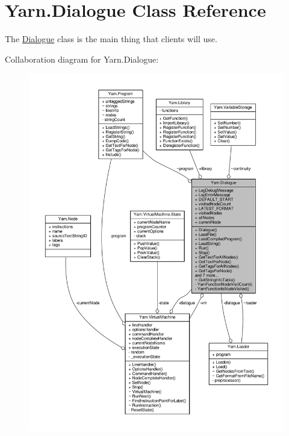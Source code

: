 \hypertarget{a00088}{\section{Yarn.\-Dialogue Class Reference}
\label{a00088}
}


The \hyperlink{a00088}{Dialogue} class is the main thing that clients will use.  




Collaboration diagram for Yarn.\-Dialogue\-:
\nopagebreak
\begin{figure}[H]
\begin{center}
\leavevmode
\includegraphics[width=350pt]{a00587}
\end{center}
\end{figure}
